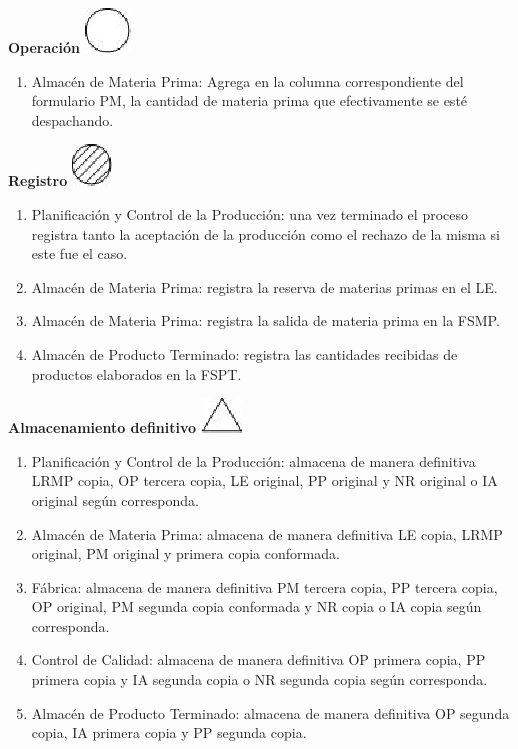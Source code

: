 \begin{center}
  \textbf{Operación}
  \includegraphics{./Images/Simbolos/simbolo-Operacion.png}
\end{center}
\begin{enumerate}
  \item Almac\'en de Materia Prima: Agrega en la columna correspondiente del formulario PM, la cantidad de materia prima que efectivamente se est\'e despachando.
\end{enumerate}

\begin{center}
  \textbf{Registro}
  \includegraphics{./Images/Simbolos/simbolo-Registro.png}
\end{center}
\begin{enumerate}
  \item Planificaci\'on y Control de la Producci\'on: una vez terminado el proceso registra tanto la aceptación de la producción como el rechazo de la misma si este fue el caso.
  \item Almac\'en de Materia Prima: registra la reserva de materias primas en el LE.
  \item Almac\'en de Materia Prima: registra la salida de materia prima en la FSMP.
  \item Almac\'en de Producto Terminado: registra las cantidades recibidas de productos elaborados en la FSPT.
\end{enumerate}

\begin{center}
  \textbf{Almacenamiento definitivo}
  \includegraphics{./Images/Simbolos/simbolo-Almacenamiento-Definitivo.png}
\end{center}
\begin{enumerate}
  \item Planificaci\'on y Control de la Producci\'on: almacena de manera definitiva LRMP copia, OP tercera copia, LE original, PP original y NR original o IA original seg\'un corresponda.
  \item Almac\'en de Materia Prima: almacena de manera definitiva LE copia, LRMP original, PM original y primera copia conformada. 
  \item F\'abrica: almacena de manera definitiva PM tercera copia, PP tercera copia, OP original, PM segunda copia conformada y NR copia o IA copia seg\'un corresponda.
  \item Control de Calidad: almacena de manera definitiva OP primera copia, PP primera copia y IA segunda copia o NR segunda copia seg\'un corresponda.
  \item Almac\'en de Producto Terminado: almacena de manera definitiva OP segunda copia, IA primera copia y PP segunda copia.
\end{enumerate}

